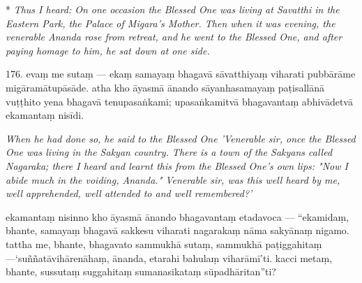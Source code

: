 \documentclass[12pt]{book}
\begin{document}
\begin{paracol}{2}
	\begin{column}*
{\itshape\footnotesize Thus I heard: On one occasion the Blessed One was living at Savatthi in the Eastern Park, the Palace of Migara's Mother. Then when it was evening, the venerable Ananda rose from retreat, and he went to the Blessed One, and after paying homage to him, he sat down at one side.}
\switchcolumn
	\begin{flushleft}
 176. evaṃ me sutaṃ — ekaṃ samayaṃ bhagavā sāvatthiyaṃ viharati pubbārāme migāramātupāsāde. atha kho āyasmā ānando sāyanhasamayaṃ paṭisallānā vuṭṭhito yena bhagavā tenupasaṅkami; upasaṅkamitvā bhagavantaṃ abhivādetvā ekamantaṃ nisīdi.
 	
 \switchcolumn*
 \end{flushleft}
{\itshape\footnotesize When he had done so, he said to the Blessed One 'Venerable sir, once the Blessed One was living in the Sakyan country. There is a town of the Sakyans called Nagaraka; there I heard and learnt this from the Blessed One's own lips: "Now I abide much in the voiding, Ananda." Venerable sir, was this well heard by me, well apprehended, well attended to and well remembered?'}
\switchcolumn
	\begin{flushleft}
ekamantaṃ nisinno kho āyasmā ānando bhagavantaṃ etadavoca — “ekamidaṃ, bhante, samayaṃ bhagavā sakkesu viharati nagarakaṃ nāma sakyānaṃ nigamo. tattha me, bhante, bhagavato sammukhā sutaṃ, sammukhā paṭiggahitaṃ —‘suññatāvihārenāhaṃ, ānanda, etarahi bahulaṃ viharāmī’ti. kacci metaṃ, bhante, sussutaṃ suggahitaṃ sumanasikataṃ sūpadhāritan”ti?
\switchcolumn*
	\end{flushleft}

\end{column}
\end{paracol}
\end{document}
